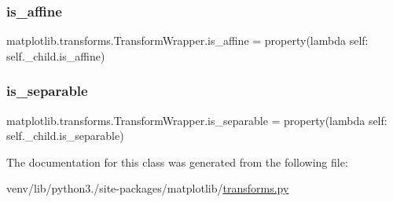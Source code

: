 \subsubsection{\texorpdfstring{is\+\_\+affine}{is\_affine}}
{\footnotesize\ttfamily matplotlib.\+transforms.\+Transform\+Wrapper.\+is\+\_\+affine = property(lambda self\+: self.\+\_\+child.\+is\+\_\+affine)\hspace{0.3cm}{\ttfamily [static]}}

\mbox{\label{classmatplotlib_1_1transforms_1_1TransformWrapper_a70e7a6a89879866c3b526d3a54e44f32}} 
\subsubsection{\texorpdfstring{is\+\_\+separable}{is\_separable}}
{\footnotesize\ttfamily matplotlib.\+transforms.\+Transform\+Wrapper.\+is\+\_\+separable = property(lambda self\+: self.\+\_\+child.\+is\+\_\+separable)\hspace{0.3cm}{\ttfamily [static]}}



The documentation for this class was generated from the following file\+:\begin{DoxyCompactItemize}
\item 
venv/lib/python3./site-\/packages/matplotlib/\hyperlink{transforms_8py}{transforms.\+py}\end{DoxyCompactItemize}
